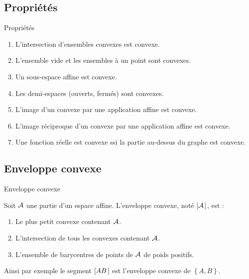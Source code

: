 \documentclass{m53beamer}
\begin{document}
\subsection{Propriétés}
\begin{frame}{Propriétés}
  \begin{enumerate}[<+(1)->]
    \item L'intersection d'ensembles convexes est convexe.
    \item L'ensemble vide et les ensembles à un point sont convexes.
    \item Un sous-espace affine est convexe.
    \item Les demi-espaces (ouverts, fermés) sont convexes.
    \item L'image d'un convexe par une application affine est convexe.
    \item L'image réciproque d'un convexe par une application affine est convexe.
    \item Une fonction réelle est convexe ssi la partie au-dessus du graphe est convexe.
  \end{enumerate}
\end{frame}

\subsection{Enveloppe convexe}
\begin{frame}{Enveloppe convexe}
  \begin{defprop}
    Soit $\mathcal{A}$ une partie d'un espace affine. L'enveloppe convexe, noté $[{\mathcal{A}}\kern.14em]$, est :
    \begin{enumerate}[<+(1)->]
      \item Le plus petit convexe contenant $\mathcal{A}$.
      \item L'intersection de tous les convexes contenant $\mathcal{A}$.
      \item L'ensemble de barycentres de points de $\mathcal{A}$ de poids positifs.
    \end{enumerate}
  \end{defprop}\pause
    Ainsi par exemple le segment $[{AB}\kern.14em]$ est l'enveloppe convexe de $\left\{A,B\right\}$.
\end{frame}
\end{document}
